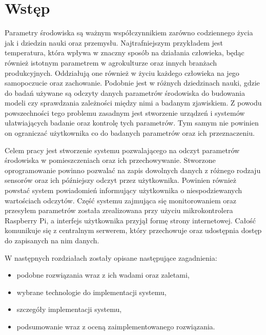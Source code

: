 \chapter{Wstęp}

Parametry środowiska są ważnym współczynnikiem zarówno codziennego życia jak
i dziedzin nauki oraz przemysłu. Najtrafniejszym przykładem jest temperatura, 
która wpływa w znaczny sposób na działania człowieka, będąc również istotnym
parametrem w agrokulturze oraz innych branżach produkcyjnych. Oddziałują
one również w życiu każdego człowieka na jego samopoczucie oraz zachowanie.
Podobnie jest w różnych dziedzinach nauki, gdzie do badań używane są odczyty
danych parametrów środowiska do budowania modeli czy sprawdzania zależności
między nimi a badanym zjawiskiem. Z powodu powszechności
tego problemu zasadnym jest stworzenie urządzeń i systemów ułatwiających badanie
oraz kontrolę tych parametrów. Tym samym nie powinien on ograniczać użytkownika
co do badanych parametrów oraz ich przeznaczeniu.

Celem pracy jest stworzenie systemu pozwalającego na odczyt parametrów środowiska
w pomieszczeniach oraz ich przechowywanie. Stworzone oprogramowanie powinno pozwalać
na zapis dowolnych danych z różnego rodzaju sensorów oraz ich późniejszy odczyt
przez użytkownika. Powinien również powstać system powiadomień informujący
użytkownika o niespodziewanych wartościach odczytów.
Część systemu zajmująca się monitorowaniem oraz przesyłem
parametrów została zrealizowana przy użyciu mikrokontrolera Raspberry Pi, a
interfejs użytkownika przyjął formę strony internetowej. Całość komunikuje się
z centralnym serwerem, który przechowuje oraz udostępnia dostęp do
zapisanych na nim danych.

W następnych rozdziałach zostały opisane następujące zagadnienia:
\begin{itemize}
  \item podobne rozwiązania wraz z ich wadami oraz zaletami,
  \item wybrane technologie do implementacji systemu,
  \item szczegóły implementacji systemu,
  \item podsumowanie wraz z oceną zaimplementowanego rozwiązania.
\end{itemize}
